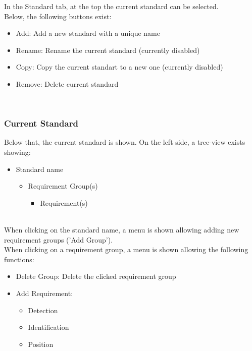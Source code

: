 In the Standard tab, at the top the current standard can be selected. \\

Below, the following buttons exist:
\begin{itemize}  
\item Add: Add a new standard with a unique name
\item Rename: Rename the current standard (currently disabled)
\item Copy: Copy the current standart to a new one (currently disabled)
\item Remove: Delete current standard
\end{itemize}
\ \\

\subsubsection{Current Standard}

Below that, the current standard is shown. On the left side, a tree-view exists showing:
\begin{itemize}  
\item Standard name
\begin{itemize}  
\item Requirement Group(s)
\begin{itemize}  
\item Requirement(s)
\end{itemize}
\end{itemize}
\end{itemize}
\ \\

When clicking on the standard name, a menu is shown allowing adding new requirement groups ('Add Group'). \\

When clicking on a requirement group, a menu is shown allowing the following functions:
\begin{itemize}  
\item Delete Group: Delete the clicked requirement group
\item Add Requirement:
\begin{itemize}  
\item Detection
\item Identification
\item Position
\end{itemize}
\end{itemize}
\ \\

